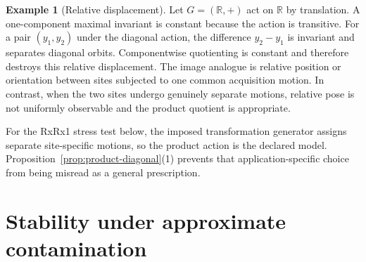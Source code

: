 \documentclass[11pt]{article}
\theoremstyle{plain}
\theoremstyle{definition}
\newtheorem{example}[theorem]{Example}
\numberwithin{equation}{section}
\newcommand{\R}{\mathbb R}
\newcommand{\1}{\mathbf 1}
\begin{document}
\begin{example}[Relative displacement]
Let $G=(\R,+)$ act on $\R$ by translation. A one-component maximal invariant is constant because the action is transitive. For a pair $(y_1,y_2)$ under the diagonal action, the difference $y_2-y_1$ is invariant and separates diagonal orbits. Componentwise quotienting is constant and therefore destroys this relative displacement. The image analogue is relative position or orientation between sites subjected to one common acquisition motion. In contrast, when the two sites undergo genuinely separate motions, relative pose is not uniformly observable and the product quotient is appropriate.
\end{example}

For the RxRx1 stress test below, the imposed transformation generator assigns separate site-specific motions, so the product action is the declared model. Proposition~\ref{prop:product-diagonal}(1) prevents that application-specific choice from being misread as a general prescription.

\section{Stability under approximate contamination}\label{sec:approx}
\end{document}
